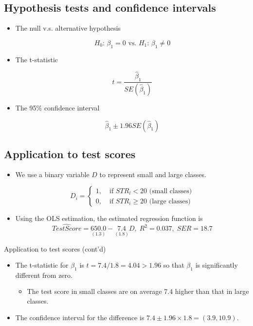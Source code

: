 \documentclass[presentation]{beamer}
\begin{document}
\subsection*{Hypothesis tests and confidence intervals}
\label{sec:org3530403}

\begin{itemize}
\item The null v.s. alternative hypothesis

\[ H_0:\, \beta_1 = 0 \text{ vs. } H_1:\, \beta_1 \neq 0 \]

\item The t-statistic

\[ t = \frac{\hat{\beta}_1}{SE(\hat{\beta}_1)} \]

\item The 95\% confidence interval

\[ \hat{\beta}_1 \pm 1.96 SE(\hat{\beta}_1) \]
\end{itemize}

\subsection*{Application to test scores}
\label{sec:orge8f68ca}

\begin{itemize}
\item We use a binary variable \(D\) to represent small and large
classes. 

\begin{equation*}
D_i =
\begin{cases}
1,\; &\text{if } STR_i < 20 \text{ (small classes)} \\
0,\; &\text{if } STR_i \geq 20 \text{ (large classes)}
\end{cases}
\end{equation*}

\item Using the OLS estimation, the estimated regression function is
\begin{equation*}
\widehat{TestScore} = \underset{\displaystyle (1.3)}{650.0} -
\underset{\displaystyle (1.8)}{7.4} D,\; R^2 = 0.037,\; SER = 18.7
\end{equation*}
\end{itemize}

\begin{frame}[label={sec:orgd225677}]{Application to test scores (cont'd)}
\begin{itemize}
\item The t-statistic for \(\beta_1\) is \(t = 7.4 / 1.8 = 4.04 > 1.96\) so that
\(\beta_1\) is significantly different from zero. 
\begin{itemize}
\item The test score in small classes are on average 7.4 higher than that in
large classes.
\end{itemize}

\item The confidence interval for the difference is \(7.4 \pm
  1.96 \times 1.8 = (3.9, 10.9)\).
\end{itemize}
\end{frame}
\end{document}
